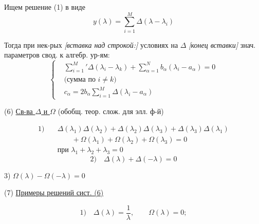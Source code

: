 Ищем решение (1) в виде
\begin{equation*}
y(\lambda)=\sum_{i=1}^M\Delta(\lambda-\lambda_i)
\tag{4}
\end{equation*}

Тогда при нек-рых
\textit{[вставка над строкой:]} условиях на $\Delta$
\textit{[конец вставки]}
знач. параметров свод. к алгебр. ур-ям:
\begin{equation*}
\left\{
\begin{aligned}
&\sum_{i=1}^{M}{}'\Delta(\lambda_i-\lambda_k)
 +\sum_{\alpha=1}^{N}b_\alpha(\lambda_i-a_\alpha)=0\\
&\text{(сумма по }i\neq k\text{)}\\
&c_\alpha=2b_\alpha\sum_{i=1}^{M}\Delta(\lambda_i-a_\alpha)
\end{aligned}
\right.
\tag{5}
\end{equation*}

(6) \underline{Св-ва $\Delta$ и $\Omega$}
\qquad (обобщ. теор. слож. для элл. ф-й)

\begin{equation*}
\begin{aligned}
1)\quad &\Delta(\lambda_1)\Delta(\lambda_2)+\Delta(\lambda_2)\Delta(\lambda_3)
+\Delta(\lambda_3)\Delta(\lambda_1)\\
&\qquad +\Omega(\lambda_1)+\Omega(\lambda_2)+\Omega(\lambda_3)=0\\
&\text{при }\lambda_1+\lambda_2+\lambda_3=0
\end{aligned}
\end{equation*}
\begin{equation*}
2)\quad \Delta(\lambda)+\Delta(-\lambda)=0
\end{equation*}

3) 
$\Omega(\lambda)-\Omega(-\lambda)=0$

(7) \underline{Примеры решений сист. (6)}

\begin{equation*}
1)\quad \Delta(\lambda)=\frac{1}{\lambda},\qquad \Omega(\lambda)=0;
\end{equation*}

